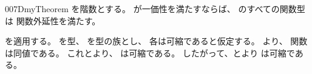 \documentclass[index]{subfiles}
\begin{document}
\begin{myBlock}{007D}{myTheorem}
  を階数とする。
  が一価性を満たすならば、
  のすべての関数型は
  関数外延性を満たす。
\end{myBlock}
\begin{myProof}
  を適用する。
  を型、
  を型の族とし、
  各は可縮であると仮定する。
  より、
  関数は同値である。
  これとより、
  は可縮である。
  したがって、とより
  は可縮である。
\end{myProof}
\end{document}
